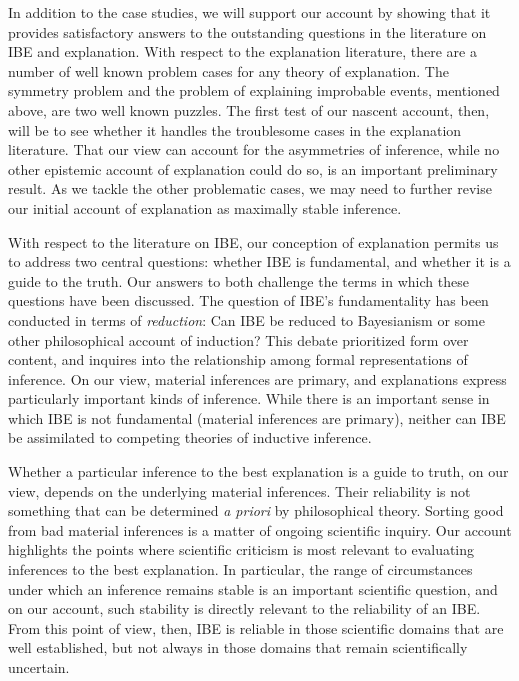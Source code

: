 \documentclass{article}[11pt]
\begin{document}
In addition to the case studies, we will support our account by showing that it provides satisfactory answers to the outstanding questions in the literature on IBE and explanation.  With respect to the explanation literature, there are a number of well known problem cases for any theory of explanation.  The symmetry problem and the problem of explaining improbable events, mentioned above, are two well known puzzles.  The first test of our nascent account, then, will be to see whether it handles the troublesome cases in the explanation literature.  That our view can account for the asymmetries of inference, while no other epistemic account of explanation could do so, is an important preliminary result.   As we tackle the other problematic cases, we may need to further revise our initial account of explanation as maximally stable inference.

With respect to the literature on IBE, our conception of explanation permits us to address two central questions: whether IBE is fundamental, and whether it is a guide to the truth.  Our answers to both challenge the terms in which these questions have been discussed. The question of IBE's fundamentality has been conducted in terms of \textit{reduction}: Can IBE be reduced to Bayesianism or some other philosophical account of induction?  This debate prioritized form over content, and inquires into the relationship among formal representations of inference.  On our view, material inferences are primary, and explanations express particularly important kinds of inference.  While there is an important sense in which IBE is not fundamental (material inferences are primary), neither can IBE be assimilated to competing theories of inductive inference.  

Whether a particular inference to the best explanation is a guide to truth, on our view, depends on the underlying material inferences.  Their reliability is not something that can be determined \textit{a priori} by philosophical theory.  Sorting good from bad material inferences is a matter of ongoing scientific inquiry.  Our account highlights the points where scientific criticism is most relevant to evaluating inferences to the best explanation.  In particular, the range of circumstances under which an inference remains stable is an important scientific question, and on our account, such stability is directly relevant to the reliability of an IBE.   From this point of view, then, IBE is reliable in those scientific domains that are well established, but not always in those domains that remain scientifically uncertain.  
\end{document}
